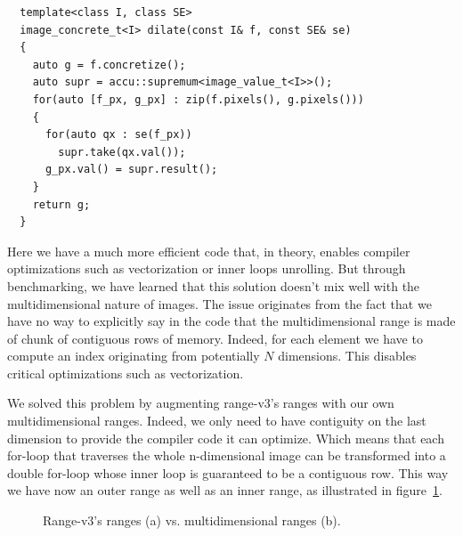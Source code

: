 \begin{verbatim}
  template<class I, class SE>
  image_concrete_t<I> dilate(const I& f, const SE& se)
  {
    auto g = f.concretize();
    auto supr = accu::supremum<image_value_t<I>>();
    for(auto [f_px, g_px] : zip(f.pixels(), g.pixels()))
    {
      for(auto qx : se(f_px))
        supr.take(qx.val());
      g_px.val() = supr.result();
    }
    return g;
  }
\end{verbatim}

Here we have a much more efficient code that, in theory, enables compiler optimizations such as vectorization or inner
loops unrolling. But through benchmarking, we have learned that this solution doesn't mix well with the multidimensional
nature of images. The issue originates from the fact that we have no way to explicitly say in the code that the
multidimensional range is made of chunk of contiguous rows of memory. Indeed, for each element we have to compute an
index originating from potentially $N$ dimensions. This disables critical optimizations such as vectorization.

We solved this problem by augmenting range-v3's ranges with our own multidimensional ranges. Indeed, we only need to
have contiguity on the last dimension to provide the compiler code it can optimize. Which means that each for-loop that
traverses the whole n-dimensional image can be transformed into a double for-loop whose inner loop is guaranteed to be a
contiguous row. This way we have now an outer range as well as an inner range, as illustrated in
figure~\ref{fig.inner.outer.range}.

\begin{figure}[htbp]
  \centering
  \caption{Range-v3's ranges (a) vs. multidimensional ranges (b).}
  \label{fig.inner.outer.range}
\end{figure}

